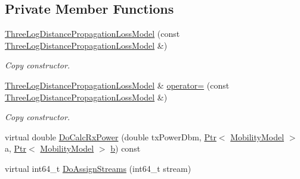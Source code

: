 \subsection*{Private Member Functions}
\begin{DoxyCompactItemize}
\item 
\hyperlink{classns3_1_1ThreeLogDistancePropagationLossModel_aba102e3a2f596ec5f1d175f40a16def9}{Three\+Log\+Distance\+Propagation\+Loss\+Model} (const \hyperlink{classns3_1_1ThreeLogDistancePropagationLossModel}{Three\+Log\+Distance\+Propagation\+Loss\+Model} \&)
\begin{DoxyCompactList}\small\item\em Copy constructor. \end{DoxyCompactList}\item 
\hyperlink{classns3_1_1ThreeLogDistancePropagationLossModel}{Three\+Log\+Distance\+Propagation\+Loss\+Model} \& \hyperlink{classns3_1_1ThreeLogDistancePropagationLossModel_a04644e578dd6f245ad34379afa16d46c}{operator=} (const \hyperlink{classns3_1_1ThreeLogDistancePropagationLossModel}{Three\+Log\+Distance\+Propagation\+Loss\+Model} \&)
\begin{DoxyCompactList}\small\item\em Copy constructor. \end{DoxyCompactList}\item 
virtual double \hyperlink{classns3_1_1ThreeLogDistancePropagationLossModel_affb50ea34b4f46000c66069c75beb04f}{Do\+Calc\+Rx\+Power} (double tx\+Power\+Dbm, \hyperlink{classns3_1_1Ptr}{Ptr}$<$ \hyperlink{classns3_1_1MobilityModel}{Mobility\+Model} $>$ a, \hyperlink{classns3_1_1Ptr}{Ptr}$<$ \hyperlink{classns3_1_1MobilityModel}{Mobility\+Model} $>$ \hyperlink{lte__pathloss_8m_a21ad0bd836b90d08f4cf640b4c298e7c}{b}) const 
\item 
virtual int64\+\_\+t \hyperlink{classns3_1_1ThreeLogDistancePropagationLossModel_a0a7481fdd4a3c056f86e94613f0f244d}{Do\+Assign\+Streams} (int64\+\_\+t stream)
\end{DoxyCompactItemize}
